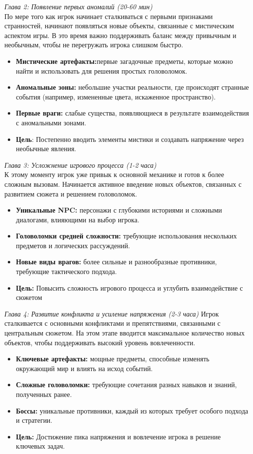 \documentclass{article}
\begin{document}
	\textit{Глава 2: Появление первых аномалий (20-60 мин)}\\
	По мере того как игрок начинает сталкиваться с первыми признаками странностей, начинают появляться новые объекты, связанные с мистическим аспектом игры. В это время важно поддерживать баланс между привычным и необычным, чтобы не перегружать игрока слишком быстро.\\
	\begin{itemize}
		\item \textbf{Мистические артефакты:}первые загадочные предметы, которые можно найти и использовать для решения простых головоломок.
		\item \textbf{Аномальные зоны:} небольшие участки реальности, где происходят странные события (например, измененные цвета, искаженное пространство).
		\item \textbf{Первые враги:} слабые существа, появляющиеся в результате взаимодействия с аномальными зонами.
		\item \textbf{Цель}: Постепенно вводить элементы мистики и создавать напряжение через необычные явления.
	\end{itemize}
	\textit{Глава 3: Усложнение игрового процесса (1-2 часа)}\\
	К этому моменту игрок уже привык к основной механике и готов к более сложным вызовам. Начинается активное введение новых объектов, связанных с развитием сюжета и решением головоломок.\\
	\begin{itemize}
		\item \textbf{Уникальные NPC:} персонажи с глубокими историями и сложными диалогами, влияющими на выбор игрока.
		\item \textbf{Головоломки средней сложности:} требующие использования нескольких предметов и логических рассуждений.
		\item \textbf{Новые виды врагов:} более сильные и разнообразные противники, требующие тактического подхода.
		\item \textbf{Цель:} Повысить сложность игрового процесса и углубить взаимодействие с сюжетом
	\end{itemize}
	
	\textit{Глава 4: Развитие конфликта и усиление напряжения (2-3 часа)}
	Игрок сталкивается с основными конфликтами и препятствиями, связанными с центральным сюжетом. На этом этапе вводится максимальное количество новых объектов, чтобы поддерживать высокий уровень вовлеченности.\\
	\begin{itemize}
		\item \textbf{Ключевые артефакты:} мощные предметы, способные изменять окружающий мир и влиять на исход событий.
		\item \textbf{Сложные головоломки:} требующие сочетания разных навыков и знаний, полученных ранее.
		\item \textbf{Боссы:} уникальные противники, каждый из которых требует особого подхода и стратегии.
		\item \textbf{Цель:} Достижение пика напряжения и вовлечение игрока в решение ключевых задач.
	\end{itemize}
	
\end{document}
